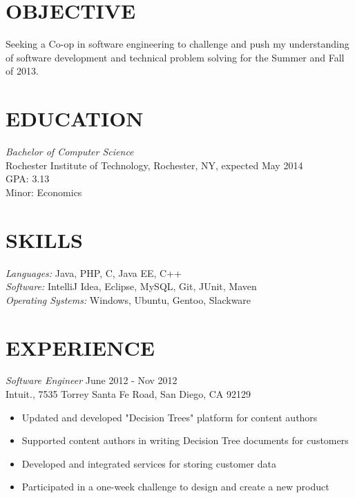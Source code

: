 \documentclass[line,margin]{res}
\begin{document}
\address{2569 Nathaniel Rochester Hall, Rochester, NY 14623}
\address{kurtz.grant@gmail.com |  (203) 240-7149}

 
\begin{resume}
 
\section{OBJECTIVE}       Seeking a Co-op in software engineering to challenge and push my understanding of software development and 
				technical problem solving for the Summer and Fall of 2013.
 
 
\section{EDUCATION} {\sl Bachelor of Computer Science} \\
	Rochester Institute of Technology, Rochester, NY,  expected May 2014 \\
	GPA: 3.13 \\
	Minor: Economics 
 
\section{SKILLS} {\sl Languages:} Java, PHP, C, Java EE, C++ \\
		{\sl Software:} IntelliJ Idea, Eclipse, MySQL, Git, JUnit, Maven \\
		{\sl Operating Systems:} Windows, Ubuntu, Gentoo, Slackware
 
\section{EXPERIENCE}

	{\sl Software Engineer} \hfill June 2012 - Nov 2012 \\
               Intuit., 
                7535 Torrey Santa Fe Road, San Diego, CA 92129
                 \begin{itemize}  \itemsep -2pt %
	\item Updated and developed "Decision Trees" platform for content authors
	\item Supported content authors in writing Decision Tree documents for customers
	\item Developed and integrated services for storing customer data
	\item Participated in a one-week challenge to design and create a new product
	\end{itemize}


\end{resume}
\end{document}
